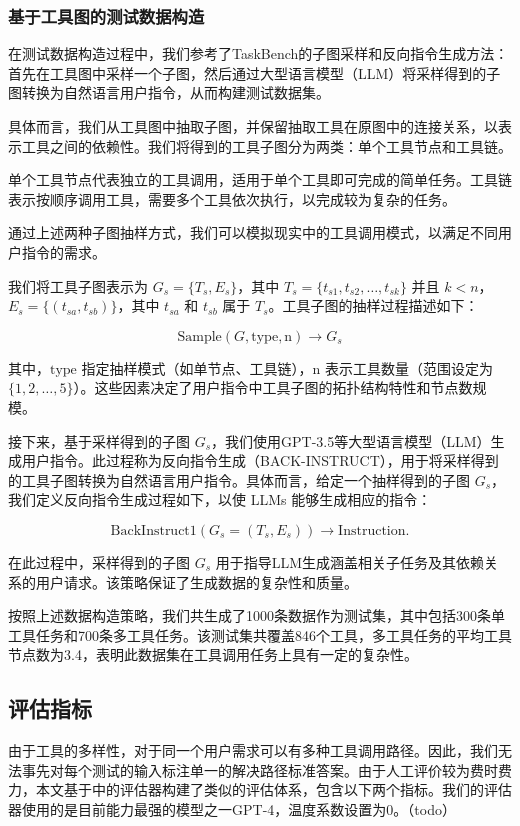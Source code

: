 \subsubsection{基于工具图的测试数据构造}

在测试数据构造过程中，我们参考了TaskBench的子图采样和反向指令生成方法：首先在工具图中采样一个子图，然后通过大型语言模型（LLM）将采样得到的子图转换为自然语言用户指令，从而构建测试数据集。

具体而言，我们从工具图中抽取子图，并保留抽取工具在原图中的连接关系，以表示工具之间的依赖性。我们将得到的工具子图分为两类：单个工具节点和工具链。

单个工具节点代表独立的工具调用，适用于单个工具即可完成的简单任务。工具链表示按顺序调用工具，需要多个工具依次执行，以完成较为复杂的任务。

通过上述两种子图抽样方式，我们可以模拟现实中的工具调用模式，以满足不同用户指令的需求。

我们将工具子图表示为 \( G_s = \{T_s, E_s\} \)，其中 \( T_s = \{t_{s1}, t_{s2}, \dots, t_{sk}\} \) 并且 \( k < n \)，\( E_s = \{(t_{sa}, t_{sb})\} \)，其中 \( t_{sa} \) 和 \( t_{sb} \) 属于 \( T_s \)。工具子图的抽样过程描述如下：

\[
\text{Sample}(G, \text{type}, \text{n}) \rightarrow G_s
\]

其中，\(\text{type}\) 指定抽样模式（如单节点、工具链），\(\text{n}\) 表示工具数量（范围设定为 \(\{1, 2, \dots, 5\}\)）。这些因素决定了用户指令中工具子图的拓扑结构特性和节点数规模。

接下来，基于采样得到的子图 \( G_s \)，我们使用GPT-3.5等大型语言模型（LLM）生成用户指令。此过程称为反向指令生成（BACK-INSTRUCT），用于将采样得到的工具子图转换为自然语言用户指令。具体而言，给定一个抽样得到的子图 \( G_s \)，我们定义反向指令生成过程如下，以使 LLMs 能够生成相应的指令：

\[
\text{BackInstruct1}(G_s = (T_s, E_s)) \rightarrow \text{Instruction}.
\]

在此过程中，采样得到的子图 \( G_s \) 用于指导LLM生成涵盖相关子任务及其依赖关系的用户请求。该策略保证了生成数据的复杂性和质量。

按照上述数据构造策略，我们共生成了1000条数据作为测试集，其中包括300条单工具任务和700条多工具任务。该测试集共覆盖846个工具，多工具任务的平均工具节点数为3.4，表明此数据集在工具调用任务上具有一定的复杂性。

\subsection{评估指标}
由于工具的多样性，对于同一个用户需求可以有多种工具调用路径。因此，我们无法事先对每个测试的输入标注单一的解决路径标准答案。由于人工评价较为费时费力，本文基于\cite{Tang2023}中的评估器构建了类似的评估体系，包含以下两个指标。我们的评估器使用的是目前能力最强的模型之一GPT-4，温度系数设置为0。（todo）

